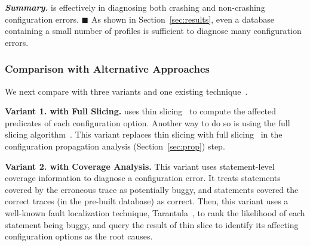 






\vspace{1mm}
\noindent \textbf{\textit{Summary.}} \ourtool is effectively
in diagnosing both crashing and non-crashing configuration errors. $\blacksquare$
As shown
in Section~\ref{sec:results}, even a database containing
a small number of profiles is sufficient to
diagnose many configuration errors.

\subsubsection{Comparison with Alternative Approaches}
\label{sec:comparison}

We next compare \ourtool with three variants and
one existing technique~\cite{Rabkin:2011:PPC}.

\vspace{1mm}
\noindent \textbf{Variant 1. \ourtool with Full Slicing.} 
\ourtool uses thin slicing~\cite{Sridharan:2007} to compute the affected predicates
of each configuration option. Another way to do so is
using the full slicing algorithm~\cite{Horwitz:1988}.
This variant replaces thin slicing with 
full slicing~\cite{Horwitz:1988} in the configuration
propagation analysis (Section~\ref{sec:prop}) step.

\vspace{1mm}
\noindent \textbf{Variant 2. \ourtool with Coverage Analysis.}
This variant uses statement-level coverage information
to diagnose a configuration error. It treats statements covered
by the erroneous trace as potentially buggy, and statements
covered the correct traces (in the pre-built database) as correct.
Then, this variant uses a well-known fault localization technique,
Tarantula~\cite{Jones:2002}, to rank the likelihood of each
statement being buggy, and query the result of thin slice
to identify its affecting configuration options as the root causes. 


